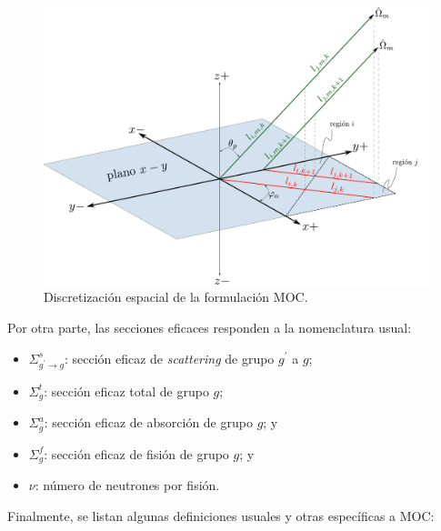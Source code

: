 \documentclass[11pt]{article}
\numberwithin{equation}{section}
\begin{document}
\begin{figure}[!h]
 \begin{center}
  \includegraphics[width=1.0\linewidth]{coords-indices-2.pdf}
 \end{center}
\caption{\label{fig:coords-indices} Discretización espacial de la formulación MOC.}
\end{figure}

Por otra parte, las secciones eficaces responden a la nomenclatura usual:

\begin{itemize}
\renewcommand\labelitemi{$\cdot$}
 \item $\Sigma^s_{g^\prime \rightarrow g}$: sección eficaz de \emph{scattering} de grupo $g^\prime$ a $g$;
 \item $\Sigma^t_g$: sección eficaz total de grupo $g$;
 \item $\Sigma^a_g$: sección eficaz de absorción de grupo $g$; y
 \item $\Sigma^f_g$: sección eficaz de fisión de grupo $g$; y
 \item $\nu$: número de neutrones por fisión.
\end{itemize}

Finalmente, se listan algunas definiciones usuales y otras específicas a MOC:
\end{document}
